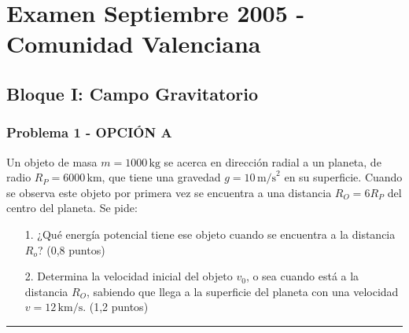 \chapter{Examen Septiembre 2005 - Comunidad Valenciana}
\label{chap:2005_sep_cv}

\section{Bloque I: Campo Gravitatorio}
\label{sec:grav_2005_sep_cv}

\subsection{Problema 1 - OPCIÓN A}
\label{subsec:1A_2005_sep_cv}

\begin{cajaenunciado}
Un objeto de masa $m=1000\,\text{kg}$ se acerca en dirección radial a un planeta, de radio $R_{P}=6000\,\text{km}$, que tiene una gravedad $g=10\,\text{m/s}^2$ en su superficie. Cuando se observa este objeto por primera vez se encuentra a una distancia $R_{O}=6 R_{P}$ del centro del planeta. Se pide:
\begin{enumerate}
    \item[1.] ¿Qué energía potencial tiene ese objeto cuando se encuentra a la distancia $R_{o}$? (0,8 puntos)
    \item[2.] Determina la velocidad inicial del objeto $v_{0}$, o sea cuando está a la distancia $R_{O}$, sabiendo que llega a la superficie del planeta con una velocidad $v=12\,\text{km/s}$. (1,2 puntos)
\end{enumerate}
\end{cajaenunciado}
\hrule

